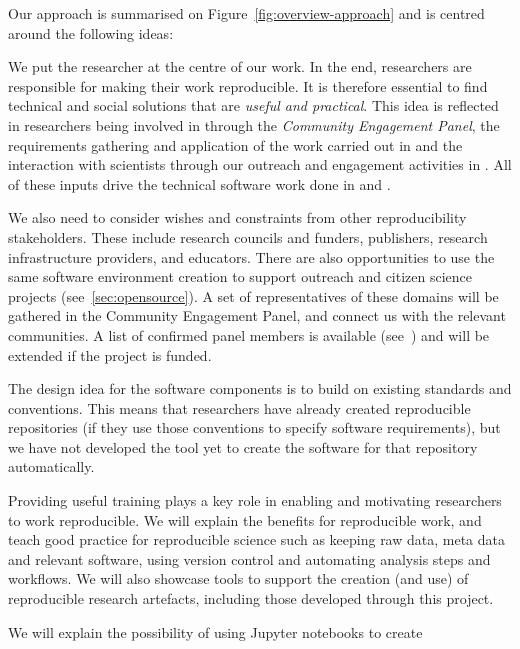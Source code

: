 Our approach is summarised on Figure~\ref{fig:overview-approach} and is centred around the following ideas:
\begin{compactenum}
  \item We put the researcher at the centre of our work. In the end,
    researchers are responsible for making their work
    reproducible. It is therefore essential to find technical and social solutions
    that are \emph{useful and practical}. This idea is reflected in researchers
    being involved in  through the \emph{Community Engagement
    Panel}, the requirements gathering and application of the work carried out
  in  and the interaction with scientists through our
  outreach and engagement activities in . All of these inputs
  drive the technical software work done in  and .
\item We also need to consider wishes and constraints from other reproducibility
  stakeholders. These include research councils and funders, publishers, research
  infrastructure providers, and educators. There are also opportunities to use the same
  software environment creation to support outreach and
  citizen science projects (see~\ref{sec:opensource}). A set of representatives of
  these domains will be gathered in the Community Engagement Panel, and connect
  us with the relevant communities. A list of confirmed panel members is
  available (see~) and will be
  extended if the project is funded.
\item The design idea for the software components is to build on existing standards and
  conventions. This means that researchers have already created reproducible
  repositories (if they use those conventions to specify software requirements),
  but we have not developed the tool yet to create the software for that
  repository automatically.
\item Providing useful training plays a key role in enabling and motivating
  researchers to work reproducible. We will explain the benefits for
  reproducible work, and teach good practice for reproducible science such as
  keeping raw data,  meta data and relevant software, using version control and
  automating analysis steps and workflows.
  We will also showcase tools to support the creation (and use) of reproducible
  research artefacts, including those developed through this project.
\item We will explain the possibility of using Jupyter notebooks to create

\end{compactenum}
